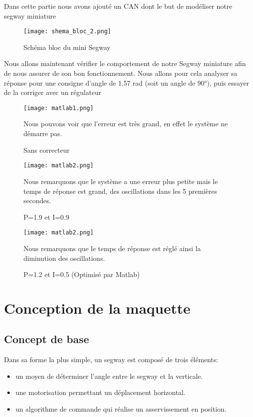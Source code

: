 \documentclass[oneside,a4paper,12pt]{article}
\begin{document}
	Dans cette partie nous avons ajouté un CAN dont le but de modéliser notre segway miniature
	
	\begin{figure}[h]
		\centering
		\texttt{[image: shema\_bloc\_2.png]}
		\caption{Schéma bloc du mini Segway}
	\end{figure}
	
	Nous allons maintenant vérifier le comportement de notre Segway miniature afin de nous assurer de son bon fonctionnement. Nous allons pour cela analyser sa réponse pour une consigne d’angle de 1.57 rad (soit un angle de 90°), puis essayer de la corriger avec un régulateur
	
	\begin{figure}[h]
		\begingroup
		\centering
		\texttt{[image: matlab1.png]}
		\caption{Sans correcteur}
		\endgroup
		\vspace{0.5cm}
		Nous pouvons voir que l’erreur est très grand, en effet le système ne démarre pas.
	\end{figure}
	\begin{figure}[h]
		\begingroup
		\centering
		\texttt{[image: matlab2.png]}
		\caption{P=1.9 et I=0.9}
		\endgroup
		\vspace{0.5cm}
		Nous remarquons que le système a une erreur plus petite mais le temps de réponse est grand, des oscillations dans les 5 premières secondes.
	\end{figure}
	\begin{figure}[t]
		\begingroup
		\centering
		\texttt{[image: matlab2.png]}
		\caption{P=1.2 et I=0.5 (Optimisé par Matlab)}
		\endgroup
		\vspace{0.5cm}
		Nous remarquons que le temps de réponse est réglé ainsi la diminution des oscillations.
	\end{figure}

	\section{Conception de la maquette}
	
	\subsection{Concept de base}
	
	Dans sa forme la plus simple, un segway est composé de trois éléments:
	
	\begin{itemize}
		\item un moyen de déterminer l'angle entre le segway et la verticale.
		\item une motorisation permettant un déplacement horizontal.
		\item un algorithme de commande qui réalise un asservissement en position. 
	\end{itemize}
\end{document}
